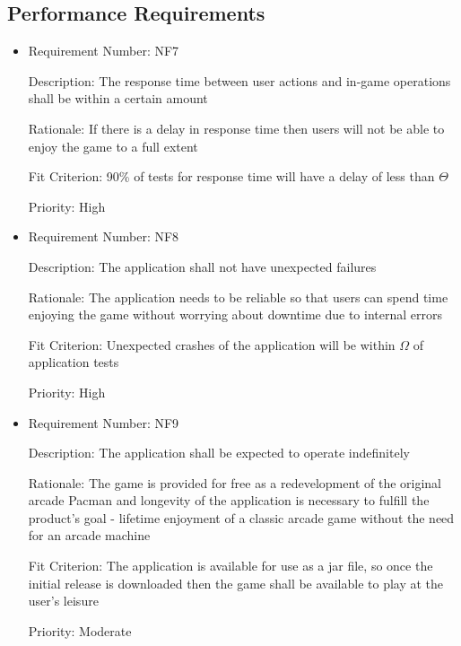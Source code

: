 \documentclass[12pt, titlepage]{article}
\begin{document}
\subsection{Performance Requirements}
\begin{itemize}
	\item
	Requirement Number: NF7

	Description: The response time between user actions and in-game operations shall be within a certain amount

	Rationale: If there is a delay in response time then users will not be able to enjoy the game to a full extent

	Fit Criterion: 90\% of tests for response time will have a delay of less than $\hyperref[tab:constants]{\Theta}$

	Priority: High

	\item
	Requirement Number: NF8

	Description: The application shall not have unexpected failures

	Rationale: The application needs to be reliable so that users can spend time enjoying the game without worrying about downtime due to internal errors

	Fit Criterion: Unexpected crashes of the application will be within $\hyperref[tab:constants]{\Omega}$ of application tests

	Priority: High

	\item
	Requirement Number: NF9

	Description: The application shall be expected to operate indefinitely

	Rationale: The game is provided for free as a redevelopment of the original arcade Pacman and longevity of the application is necessary to fulfill the product's goal - lifetime enjoyment of a classic arcade game without the need for an arcade machine

	Fit Criterion: The application is available for use as a jar file, so once the initial release is downloaded then the game shall be available to play at the user's leisure

	Priority: Moderate

\end{itemize}
\end{document}
